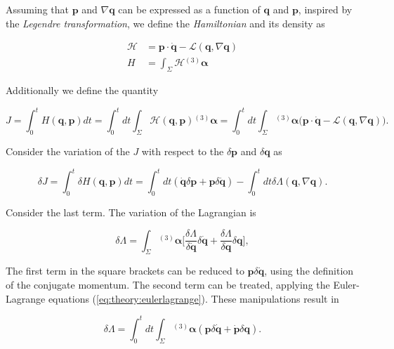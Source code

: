 Assuming that $\boldsymbol{p}$ and $\nabla\boldsymbol{q}$ can be expressed as a function of $\boldsymbol{q}$ and $\boldsymbol{p}$, inspired by the \textit{Legendre transformation}, we define the \textit{Hamiltonian} and its density as

\begin{align}
\mathcal{H} &= \boldsymbol{p}\cdot\dot{\boldsymbol{q}} - \mathcal{L}(\boldsymbol{q}, \nabla\boldsymbol{q}) \\
H &= \int_{\Sigma}\mathcal{H}{^{(3)}\boldsymbol{\alpha}}
\end{align}

Additionally we define the quantity 

\begin{equation}
J = \int_{0}^{t}H(\boldsymbol{q},\boldsymbol{p})dt = \int_{0}^{t}dt\int_{\Sigma}\mathcal{H}(\boldsymbol{q},\boldsymbol{p}){^{(3)}\boldsymbol{\alpha}} = \int_{0}^{t}dt\int_{\Sigma}{^{(3)}\boldsymbol{\alpha}}\Big(\boldsymbol{p}\cdot\dot{\boldsymbol{q}} - \mathcal{L}(\boldsymbol{q},\nabla\boldsymbol{q})\Big).
\end{equation}

Consider the variation of the $J$ with respect to the $\delta\boldsymbol{p}$ and $\delta\boldsymbol{q}$ as

\begin{equation}
\delta J = \int_{0}^{t}\delta H(\boldsymbol{q},\boldsymbol{p})dt = \int_{0}^{t}dt (\dot{\boldsymbol{q}}\delta\boldsymbol{p}+\boldsymbol{p}\delta\dot{\boldsymbol{q}}) - \int_{0}^{t}dt\delta\Lambda(\boldsymbol{q}, \nabla\boldsymbol{q}).
\end{equation}

Consider the last term. The variation of the Lagrangian is

\begin{equation}
\delta\Lambda = \int_{\Sigma}{^{(3)}\boldsymbol{\alpha}}\Bigg[\frac{\delta\Lambda}{\delta\dot{\boldsymbol{q}}}\delta\dot{\boldsymbol{q}}+\frac{\delta\Lambda}{\delta\boldsymbol{q}}\delta\boldsymbol{q}\Bigg],
\end{equation}

The first term in the square brackets can be reduced to $\boldsymbol{p}\delta\dot{\boldsymbol{q}}$, using the definition of the conjugate momentum. 
The second term can be treated, applying the Euler-Lagrange equations (\ref{eq:theory:eulerlagrange}). 
These manipulations result in

\begin{equation}
\delta\Lambda = \int_{0}^{t}dt\int_{\Sigma}{^{(3)}\boldsymbol{\alpha}}(\boldsymbol{p}\delta\dot{\boldsymbol{q}} + \dot{\boldsymbol{p}}\delta\boldsymbol{q}).
\end{equation}

